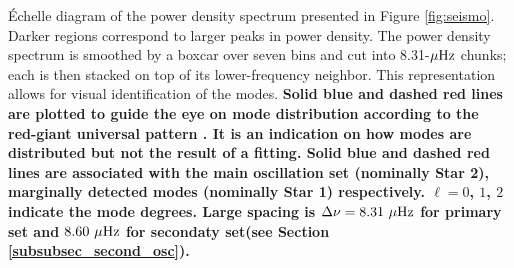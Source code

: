 \label{fig:echelle} \'Echelle diagram of the power density spectrum presented in Figure \ref{fig:seismo}. Darker regions correspond to larger peaks in power density. The power density spectrum is smoothed by a boxcar over seven bins and cut into 8.31-$\mu\rm{Hz}$ chunks; each is then stacked on top of its lower-frequency neighbor. This representation allows for visual identification of the modes. \textbf{Solid blue and dashed red lines are plotted to guide the eye on mode distribution according to the red-giant universal pattern \citep{mos11}. It is an indication on how modes are distributed but not the result of a fitting. Solid blue and dashed red lines are associated with the main oscillation set (nominally Star 2), marginally detected modes (nominally Star 1) respectively. $\ell = 0$, $1$, $2$ indicate the mode degrees. Large spacing is $\Delta\nu = 8.31\ \mu\rm{Hz}$ for primary set and $8.60\ \mu\rm{Hz}$ for secondaty set(see Section \ref{subsubsec_second_osc}).}

  